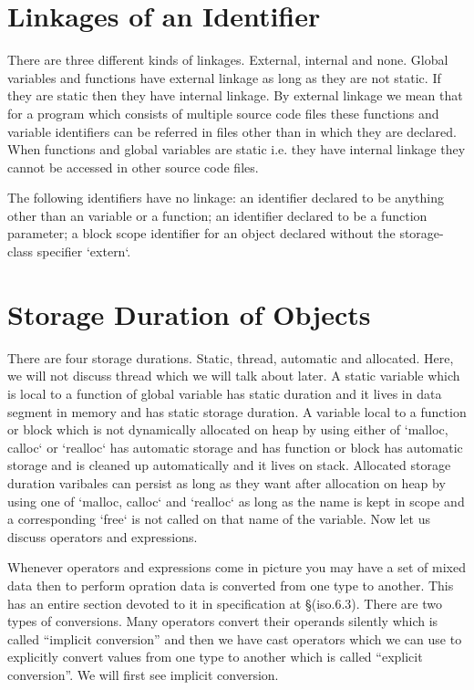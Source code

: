 \section{Linkages of an Identifier}
There are three different kinds of linkages. External, internal and
none. Global variables and functions have external linkage as long as they are
not static. If they are static then they have internal linkage. By external
linkage we mean that for a program which consists of multiple source code files
these functions and variable identifiers can be referred in files other than in
which they are declared. When functions and global variables are static
i.e. they have internal linkage they cannot be accessed in other source code
files.

The following identifiers have no linkage: an identifier declared to be
anything other than an variable or a function; an identifier declared to be a
function parameter; a block scope identifier for an object declared without the
storage-class specifier `extern`.

\section{Storage Duration of Objects}
There are four storage durations. Static, thread, automatic and
allocated. Here, we will not discuss thread which we will talk about later. A
static variable which is local to a function of global variable has static
duration and it lives in data segment in memory and has static storage
duration. A variable local to a function or block which is not dynamically
allocated on heap by using either of `malloc, calloc` or `realloc` has
automatic storage and has function or block has automatic storage and is
cleaned up automatically and it lives on stack. Allocated storage duration
varibales can persist as long as they want after allocation on heap by using
one of `malloc, calloc` and `realloc` as long as the name is kept
in scope and a corresponding `free` is not called on that name of the
variable. Now let us discuss operators and expressions.


Whenever operators and expressions come in picture you may have a set of mixed
data then to perform opration data is converted from one type to another. This
has an entire section devoted to it in specification at \S(iso.6.3). There are two
types of conversions. Many operators convert their operands silently which is
called ``implicit conversion'' and then we have cast operators
which we can use to explicitly convert values from one type to another which is
called ``explicit conversion''. We will first see implicit conversion.

